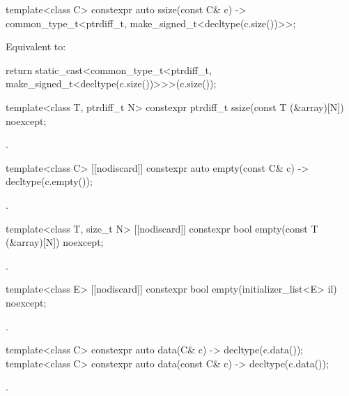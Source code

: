 %
\begin{itemdecl}
template<class C> constexpr auto ssize(const C& c)
  -> common_type_t<ptrdiff_t, make_signed_t<decltype(c.size())>>;
\end{itemdecl}
\begin{itemdescr}
\pnum
\effects
Equivalent to:
\begin{codeblock}
return static_cast<common_type_t<ptrdiff_t, make_signed_t<decltype(c.size())>>>(c.size());
\end{codeblock}
\end{itemdescr}

%
\begin{itemdecl}
template<class T, ptrdiff_t N> constexpr ptrdiff_t ssize(const T (&array)[N]) noexcept;
\end{itemdecl}
\begin{itemdescr}
\pnum
\returns
{}.
\end{itemdescr}

%
\begin{itemdecl}
template<class C> [[nodiscard]] constexpr auto empty(const C& c) -> decltype(c.empty());
\end{itemdecl}
\begin{itemdescr}
\pnum
\returns
{}.
\end{itemdescr}

%
\begin{itemdecl}
template<class T, size_t N> [[nodiscard]] constexpr bool empty(const T (&array)[N]) noexcept;
\end{itemdecl}
\begin{itemdescr}
\pnum
\returns
{}.
\end{itemdescr}

%
\begin{itemdecl}
template<class E> [[nodiscard]] constexpr bool empty(initializer_list<E> il) noexcept;
\end{itemdecl}
\begin{itemdescr}
\pnum
\returns
{}.
\end{itemdescr}

%
\begin{itemdecl}
template<class C> constexpr auto data(C& c) -> decltype(c.data());
template<class C> constexpr auto data(const C& c) -> decltype(c.data());
\end{itemdecl}
\begin{itemdescr}
\pnum
\returns
{}.
\end{itemdescr}

